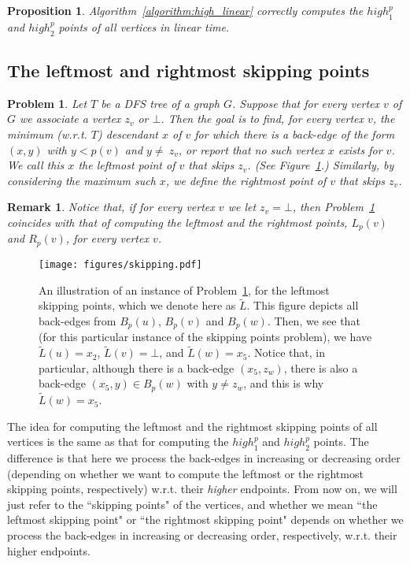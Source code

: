 \documentclass[11pt,a4paper]{article}
\newtheorem{proposition}[theorem]{Proposition}
\newtheorem{problem}[theorem]{Problem}
\newtheorem{remark}[theorem]{Remark}
\begin{document}
\begin{proposition}
Algorithm~\ref{algorithm:high_linear} correctly computes the $\mathit{high}^p_1$ and $\mathit{high}^p_2$ points of all vertices in linear time.
\end{proposition}


\subsection{The leftmost and rightmost skipping points}
\label{section:skippingPoints}

\begin{problem}
\label{problem:leftmost_skipping}
\normalfont
Let $T$ be a DFS tree of a graph $G$. Suppose that for every vertex $v$ of $G$ we associate a vertex $z_v$ or $\bot$. Then the goal is to find, for every vertex $v$, the minimum (w.r.t. $T$) descendant $x$ of $v$ for which there is a back-edge of the form $(x,y)$ with $y<p(v)$ and $y\neq\ z_v$, or report that no such vertex $x$ exists for $v$. We call this $x$ \emph{the leftmost point of $v$ that skips $z_v$}. (See Figure~\ref{figure:skipping}.) Similarly, by considering the maximum such $x$, we define \emph{the rightmost point of $v$ that skips $z_v$}. 
\end{problem}
\begin{remark}
\normalfont
Notice that, if for every vertex $v$ we let $z_v=\bot$, then Problem~\ref{problem:leftmost_skipping} coincides with that of computing the leftmost and the rightmost points, $L_p(v)$ and $R_p(v)$, for every vertex $v$.
\end{remark}

\begin{figure}[h!]\centering
\texttt{[image: figures/skipping.pdf]}
\caption{\small{An illustration of an instance of Problem~\ref{problem:leftmost_skipping}, for the leftmost skipping points, which we denote here as $\widetilde{L}$. This figure depicts all back-edges from $B_p(u)$, $B_p(v)$ and $B_p(w)$. Then, we see that (for this particular instance of the skipping points problem), we have $\widetilde{L}(u)=x_2$, $\widetilde{L}(v)=\bot$, and $\widetilde{L}(w)=x_5$. Notice that, in particular, although there is a back-edge $(x_5,z_w)$, there is also a back-edge $(x_5,y)\in B_p(w)$ with $y\neq z_w$, and this is why $\widetilde{L}(w)=x_5$.}}\label{figure:skipping}
\end{figure}

The idea for computing the leftmost and the rightmost skipping points of all vertices is the same as that for computing the $\mathit{high}^p_1$ and $\mathit{high}^p_2$ points. The difference is that here we process the back-edges in increasing or decreasing order (depending on whether we want to compute the leftmost or the rightmost skipping points, respectively) w.r.t. their \emph{higher} endpoints. From now on, we will just refer to the ``skipping points" of the vertices, and whether we mean ``the leftmost skipping point" or ``the rightmost skipping point" depends on whether we process the back-edges in increasing or decreasing order, respectively, w.r.t. their higher endpoints.
\end{document}
